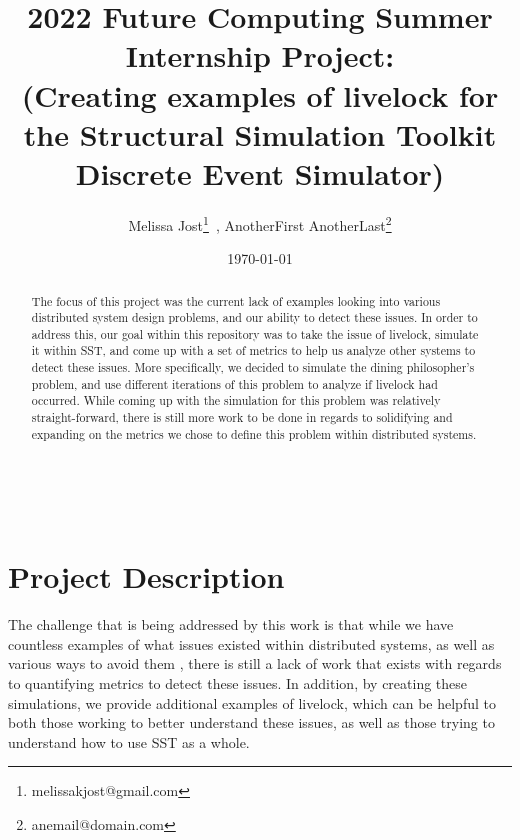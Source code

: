 \documentclass{article}
\begin{document}
    \begin{minipage}[h]{\textwidth}
        \title{2022 Future Computing Summer Internship Project:\\(Creating examples of livelock for the Structural Simulation Toolkit Discrete Event Simulator)}
        \author{Melissa Jost\footnote{melissakjost@gmail.com}\ , 
        AnotherFirst AnotherLast\footnote{anemail@domain.com}}
        \date{\today}
            \maketitle
        \begin{abstract}
            The focus of this project was the current lack of examples looking into various distributed system
            design problems, and our ability to detect these issues.  In order to address this, our goal within this 
            repository was to take the issue of livelock, simulate it within SST, and come up with a set of metrics to 
            help us analyze other systems to detect these issues.  More specifically, we decided to simulate the 
            dining philosopher's problem, and use different iterations of this problem to analyze if livelock had occurred.  
            While coming up with the simulation for this problem was relatively straight-forward, there is still more work 
            to be done in regards to solidifying and expanding on the metrics we chose to define this problem within distributed systems. 
        \end{abstract}
    \end{minipage}

\ \\


\section{Project Description} %

The challenge that is being addressed by this work is that while we have countless examples of 
what issues existed within distributed systems, as well as various ways to avoid them , there is 
still a lack of work that exists with regards to quantifying metrics to detect these issues.  
In addition, by creating these simulations, we provide additional examples of livelock, which can be 
helpful to both those working to better understand these issues, as well as those trying to 
understand how to use SST as a whole.
\end{document}

